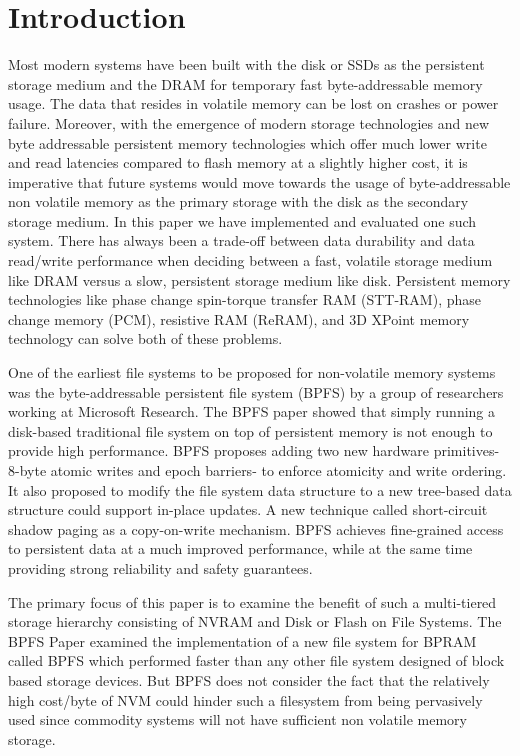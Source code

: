 \section{Introduction}
\label{sec-intro}
Most modern systems have been built with the disk or SSDs as the persistent storage medium and the DRAM for temporary fast byte-addressable memory usage. The data that resides in volatile memory can be lost on crashes or power failure. Moreover, with the emergence of modern storage technologies and new byte addressable persistent memory technologies which offer much lower write and read latencies compared to flash memory at a slightly higher cost, it is imperative that future systems would move towards the usage of byte-addressable non volatile memory as the primary storage with the disk as the secondary storage medium. In this paper we have implemented and evaluated one such system. There has always been a trade-off between data durability and data read/write performance when deciding between a fast, volatile storage medium like DRAM versus a slow, persistent storage medium like disk. Persistent memory technologies like phase change spin-torque transfer RAM (STT-RAM), phase change memory (PCM), resistive RAM (ReRAM), and 3D XPoint memory technology can solve both of these problems.

One of the earliest file systems to be proposed for non-volatile memory systems was the byte-addressable persistent file system (BPFS) \cite{c10} by a group of researchers working at Microsoft Research. The BPFS paper showed that simply running a disk-based traditional file system on top of persistent memory is not enough to provide high performance. BPFS proposes adding two new hardware primitives- 8-byte atomic writes and epoch barriers- to enforce atomicity and write ordering. It also proposed to modify the file system data structure to a new tree-based data structure  could support in-place updates. A new technique called short-circuit shadow paging as a copy-on-write mechanism. BPFS achieves fine-grained access to persistent data at a much improved performance, while at the same time providing strong reliability and safety guarantees.

The primary focus of this paper is to examine the benefit of such a multi-tiered storage hierarchy consisting of NVRAM and Disk or Flash on File Systems. The BPFS Paper \cite{c10} examined the implementation of a new file system for BPRAM called BPFS which performed faster than any other file system designed of block based storage devices. But BPFS does not consider the fact that the relatively high cost/byte of NVM could hinder such a filesystem from being pervasively used since commodity systems will not have sufficient non volatile memory storage.

